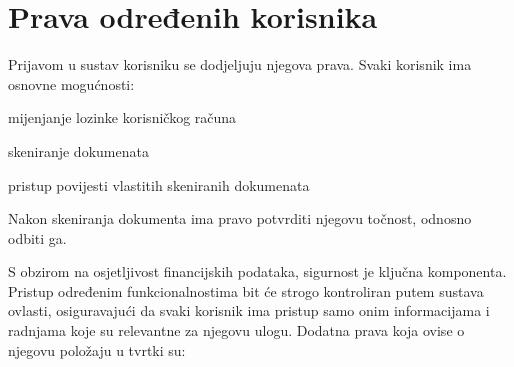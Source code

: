 		\section{Prava određenih korisnika}
		
		Prijavom u sustav korisniku se dodjeljuju njegova prava. Svaki korisnik ima osnovne mogućnosti:
		\begin{packed_item}
			\item mijenjanje lozinke korisničkog računa
			\item skeniranje dokumenata
			\item pristup povijesti vlastitih skeniranih dokumenata
			\item Nakon skeniranja dokumenta ima pravo potvrditi njegovu točnost, odnosno odbiti ga.
		\end{packed_item}
		S obzirom na osjetljivost financijskih podataka, sigurnost je ključna komponenta. Pristup određenim funkcionalnostima bit će strogo kontroliran putem sustava ovlasti,
		 osiguravajući da svaki korisnik ima pristup samo onim informacijama i radnjama koje su relevantne za njegovu ulogu.
		\newline
		Dodatna prava koja ovise o njegovu položaju u tvrtki su:
